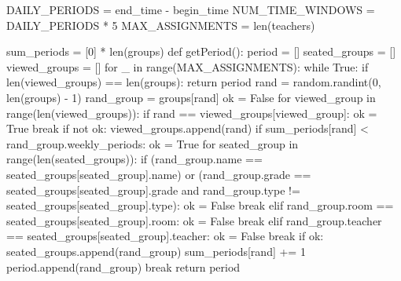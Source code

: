\documentclass[a4paper,12pt]{article}
\begin{document}
\begin{python}
DAILY_PERIODS = end_time - begin_time
NUM_TIME_WINDOWS = DAILY_PERIODS * 5
MAX_ASSIGNMENTS = len(teachers)


sum_periods = [0] * len(groups)
def getPeriod():
    period = []
    seated_groups = []
    viewed_groups = []
    for _ in range(MAX_ASSIGNMENTS):
        while True:
            if len(viewed_groups) == len(groups):
                return period
            rand = random.randint(0, len(groups) - 1)
            rand_group = groups[rand]
            ok = False
            for viewed_group in range(len(viewed_groups)):
                if rand == viewed_groups[viewed_group]:
                    ok = True
                    break
            if not ok:
                viewed_groups.append(rand)
                if sum_periods[rand] < rand_group.weekly_periods:
                    ok = True
                    for seated_group in range(len(seated_groups)):
                        if (rand_group.name == seated_groups[seated_group].name) or (rand_group.grade == seated_groups[seated_group].grade and rand_group.type != seated_groups[seated_group].type):
                            ok = False
                            break
                        elif rand_group.room == seated_groups[seated_group].room:
                            ok = False
                            break
                        elif rand_group.teacher == seated_groups[seated_group].teacher:
                            ok = False
                            break
                    if ok:
                        seated_groups.append(rand_group)
                        sum_periods[rand] += 1
                        period.append(rand_group)
                        break
    return period
\end{python}
\end{document}
